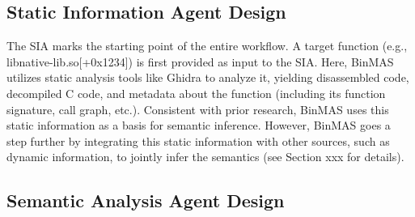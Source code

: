 \documentclass[acmsmall,screen,review,anonymous]{acmart} %
\begin{document}

\subsection{Static Information Agent Design}

The SIA marks the starting point of the entire workflow. A target function (e.g., libnative-lib.so[+0x1234]) is first provided as input to the SIA. Here, BinMAS utilizes static analysis tools like Ghidra to analyze it, yielding disassembled code, decompiled C code, and metadata about the function (including its function signature, call graph, etc.). Consistent with prior research, BinMAS uses this static information as a basis for semantic inference. However, BinMAS goes a step further by integrating this static information with other sources, such as dynamic information, to jointly infer the semantics (see Section xxx for details).

\subsection{Semantic Analysis Agent Design}
\end{document}

